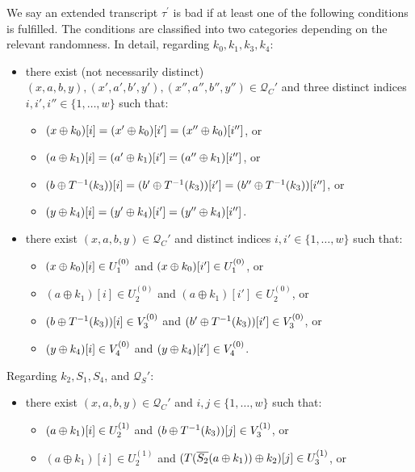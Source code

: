 \documentclass[journal=tosc,final,nohyperref]{iacrtrans}
\begin{document}
\begin{definition}
	\label{defn:bad-tau-4-rounds}
	
	We say an extended transcript $\tau^{\prime}$ is bad if at least one of the following conditions is fulfilled. The conditions are classified into two categories depending on the relevant randomness. In detail, regarding $k_0,k_1,k_3,k_4$:
	\begin{itemize}[leftmargin=10mm]
		\item[\bone] there exist (not necessarily distinct) $(x,a,b,y),(x',a',b',y'),(x'',a'',b'',y'')\in \mathcal{Q}_{C}'$ and three distinct indices $i, i', i'' \in \{1, \ldots, w\}$ such that:
		\begin{itemize}
			\item $(x\oplus k_0)[i]=(x'\oplus k_0)[i']=(x''\oplus k_0)[i'']$, or
			\item $(a\oplus k_1)[i]=(a'\oplus k_1)[i']=(a''\oplus k_1)[i'']$, or
			\item $(b\oplus T^{-1}(k_3))[i]=(b'\oplus T^{-1}(k_3))[i']=(b''\oplus T^{-1}(k_3))[i'']$, or
			\item $(y\oplus k_4)[i]=(y'\oplus k_4)[i']=(y''\oplus k_4)[i'']$.
		\end{itemize}
		\item[\btwo] there exist $(x,a,b,y) \in \mathcal{Q}_{C}'$ and distinct indices $i, i' \in \{1, \ldots, w\}$ such that:
		\begin{itemize}
			\item $(x\oplus k_0)[i]\in U_1^{(0)}$ and $(x\oplus k_0)[i']\in U_1^{(0)}$, or
			\item $(a \oplus k_1)[i]\in U_{2}^{(0)}$ and $(a \oplus k_1)[i']\in U_{2}^{(0)}$, or
			\item $(b\oplus T^{-1}(k_3))[i]\in V_3^{(0)}$ and
			$(b'\oplus T^{-1}(k_3))[i']\in V_3^{(0)}$, or
			\item $(y\oplus k_4)[i]\in V_4^{(0)}$ and $(y\oplus k_4)[i']\in V_4^{(0)}$.
		\end{itemize}
	\end{itemize}
	Regarding $k_2,S_1,S_4$, and $\mathcal{Q}_S'$:
	\begin{itemize}[leftmargin=10mm]
		\item[\bthree] there exist $(x,a,b,y) \in \mathcal{Q}_{C}'$ and $i, j\in\{1, \ldots, w\}$ such that:
		\begin{itemize}
			\item $(a\oplus k_1)[i]\in U_2^{(1)}$ and $(b\oplus T^{-1}(k_3))[j]\in V_3^{(1)}$, or
			\item $(a \oplus k_1)[i]\in U_{2}^{(1)}$ and $(T(\overline{S_2}(a \oplus k_1))\oplus k_2)[j]\in U_{3}^{(1)}$, or

\end{itemize}
\end{itemize}
\end{definition}
\end{document}
